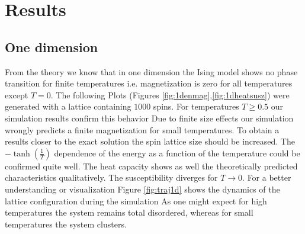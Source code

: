 \documentclass[12pt,a4paper,titlepage]{article}
\begin{document}
\section{Results}


\subsection{One dimension}

From the theory we know that in one dimension the Ising model shows no phase transition for finite temperatures i.e. magnetization is zero for all temperatures except $T=0$. The following Plots (Figures \ref{fig:1denmag},\ref{fig:1dheatsusz}) were generated with a lattice containing $1000$ spins. For temperatures $T\geq 0.5$ our simulation results confirm this behavior Due to finite size effects our simulation wrongly predicts a finite magnetization for small temperatures. To obtain a results closer to the exact solution the spin lattice size should be increased. The $-\tanh(\frac{1}{T})$ dependence of the energy as a function of the temperature could be confirmed quite well. The heat capacity shows as well the theoretically predicted characteristics qualitatively. The susceptibility diverges for $T\rightarrow0$. For a better understanding or visualization Figure \ref{fig:traj1d} shows the dynamics of the lattice configuration during the simulation As one might expect for high temperatures the system remains total disordered, whereas for small temperatures the system clusters.
\end{document}
